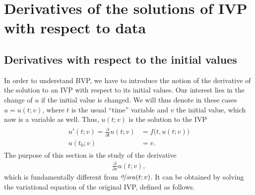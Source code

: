 \section{Derivatives of the solutions of IVP with respect to data}
\subsection{Derivatives with respect to the initial values}
\begin{intro}
  In order to understand BVP, we have to introduce the notion of the
  derivative of the solution to an IVP with respect to its initial
  values. Our interest lies in the change of $u$ if the initial value
  is changed. We will thus denote in these cases $u=u(t;v)$, where $t$ is
  the usual ``time'' variable and $v$ the initial value, which now is
  a variable as well. Thus, $u(t;v)$ is the solution to the IVP
  \begin{gather}
    \label{eq:derivatives:1}
    \begin{split}
      u'(t;v) = \tfrac{\partial}{\partial t} u(t;v) &= f\bigl(t,u(t;v)\bigr) \\
      u(t_0;v) &= v.
    \end{split}
  \end{gather}
  The purpose of this section is the study of the derivative
  \begin{gather*}
    \tfrac{\partial}{\partial v} u(t;v),
  \end{gather*}
  which is fundamentally different from $\nicefrac{\partial}{\partial t}
  u(t;v)$.
  It can be obtained by solving the variational equation of the
  original IVP, defined as follows.
\end{intro}

